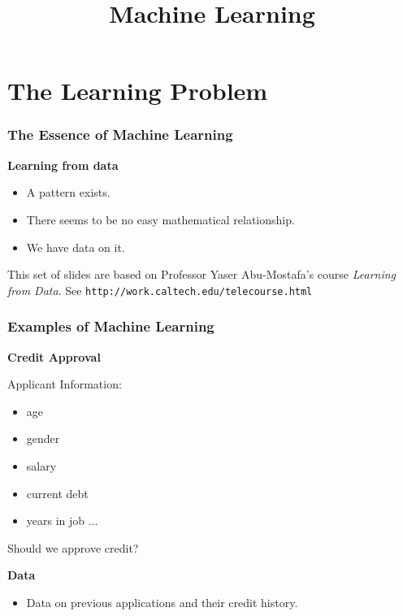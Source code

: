 \documentclass[xcolor=table]{beamer}
\title{Machine Learning}
\begin{document}
\maketitle
\section{The Learning Problem}

\begin{frame}[t]
  \frametitle{The Essence of Machine Learning}  
\textbf{Learning from data}

  \begin{itemize}
    \item A pattern exists.
    \item There seems to be no easy mathematical relationship.
    \item We have data on it.
  \end{itemize}

\bigskip

\scriptsize{This set of slides are based on Professor Yaser 
Abu-Mostafa's course \emph{Learning from Data}. See 
\texttt{http://work.caltech.edu/telecourse.html}}
\end{frame}

\begin{frame}[t]
\frametitle{Examples of Machine Learning}
\textcolor{orange2}{\textbf{Credit Approval}}

Applicant Information:

\begin{itemize}
    \item age
    \item gender
    \item salary
    \item current debt
    \item years in job $\ldots$ 
\end{itemize}

\pause

Should we approve credit? 

\bigskip

\textbf{Data}
\begin{itemize}
    \item Data on previous applications and their credit history.
\end{itemize}
\end{frame}
\end{document}
